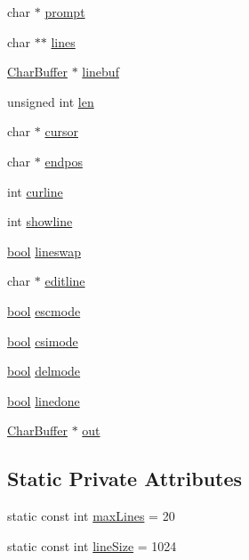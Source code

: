 \begin{DoxyCompactItemize}
\item 
char $\ast$ \hyperlink{classAnsiConoleEngine_a97ebef63ba0490711ed78733b6a87be5}{prompt}
\item 
char $\ast$$\ast$ \hyperlink{classAnsiConoleEngine_a624ec5321c326a68de340f9b77e84c2c}{lines}
\item 
\hyperlink{classCharBuffer}{Char\+Buffer} $\ast$ \hyperlink{classAnsiConoleEngine_a6bf88afa72a458e3687972f9e666cd86}{linebuf}
\item 
unsigned int \hyperlink{classAnsiConoleEngine_ad5d65280df848947f5b2dda80dcf35c6}{len}
\item 
char $\ast$ \hyperlink{classAnsiConoleEngine_aea3df1b13bc8ecf2eb68ec693249800f}{cursor}
\item 
char $\ast$ \hyperlink{classAnsiConoleEngine_a28852245082570631c7392411fec89cc}{endpos}
\item 
int \hyperlink{classAnsiConoleEngine_ab029fc4a19c5fbd6f6b23c390af618b8}{curline}
\item 
int \hyperlink{classAnsiConoleEngine_a24fe8cd3b3321c6dd4b26731cb1a8108}{showline}
\item 
\hyperlink{platform_8h_a1062901a7428fdd9c7f180f5e01ea056}{bool} \hyperlink{classAnsiConoleEngine_a23b1b0d4714995d12e7b0aacdecfa0c4}{lineswap}
\item 
char $\ast$ \hyperlink{classAnsiConoleEngine_a465421c5488f2566d12717641a327017}{editline}
\item 
\hyperlink{platform_8h_a1062901a7428fdd9c7f180f5e01ea056}{bool} \hyperlink{classAnsiConoleEngine_af497f5cbdca8bbc350935a90568b06e7}{escmode}
\item 
\hyperlink{platform_8h_a1062901a7428fdd9c7f180f5e01ea056}{bool} \hyperlink{classAnsiConoleEngine_adf2036857a6c6de85836ee2e7b3e5d6d}{csimode}
\item 
\hyperlink{platform_8h_a1062901a7428fdd9c7f180f5e01ea056}{bool} \hyperlink{classAnsiConoleEngine_a5182d9a19cc1fe8681a9faf77a156657}{delmode}
\item 
\hyperlink{platform_8h_a1062901a7428fdd9c7f180f5e01ea056}{bool} \hyperlink{classAnsiConoleEngine_a0931686f3224f07bd3a3fe25c06e32c6}{linedone}
\item 
\hyperlink{classCharBuffer}{Char\+Buffer} $\ast$ \hyperlink{classAnsiConoleEngine_ad6a604fc0a0f544907513076c72434f3}{out}
\end{DoxyCompactItemize}
\subsection*{Static Private Attributes}
\begin{DoxyCompactItemize}
\item 
static const int \hyperlink{classAnsiConoleEngine_a3f94786b1610ac3f038d5115fd8047a3}{max\+Lines} = 20
\item 
static const int \hyperlink{classAnsiConoleEngine_a59042210f69050bdfb531841e8ac0927}{line\+Size} = 1024
\end{DoxyCompactItemize}


